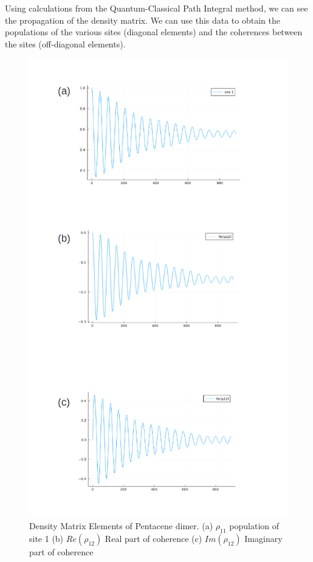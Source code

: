 Using calculations from the Quantum-Classical Path Integral method, we can see the propagation of the density matrix. We can use this data to obtain the populations of the various sites (diagonal elements) and the coherences between the sites (off-diagonal elements).

\begin{figure}
\centering
\includegraphics[scale=0.4]{Figures/pentacene_result}
\caption{Density Matrix Elements of Pentacene dimer. (a) $\rho_{11}$ population of site 1 (b) $Re(\rho_{12})$ Real part of coherence (c) $Im(\rho_{12})$ Imaginary part of coherence}
\end{figure}

